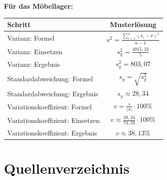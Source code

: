 \documentclass[
  11pt,
  ngerman,
  a4paper,
]{report}
\begin{document}
\textbf{Für das Möbellager:}

\begin{table}[H]
\centering
\begin{tabular}{lc}
\toprule
Schritt & Musterlösung\\
\midrule
Varianz: Formel & $s^2=\frac{\sum\limits_{i=1}^{n}(x_{i}-\bar{x})^2}{n-1}$\\
Varianz: Einsetzen & $s^2_y=\frac{4015{,}33}{5}$\\
Varianz: Ergebnis & $s^2_y=803{,}07$\\
Standardabweichung: Formel & $s_y=\sqrt{s^2_y}$\\
Standardabweichung: Ergebnis & $s_y\approx28{,}34$\\
Variationskoeffizient: Formel & $v=\frac{s}{|\bar{x}|}\cdot100\%$\\
Variationskoeffizient: Einsetzen & $v\approx\frac{28{,}34}{74{,}33}\cdot100\%$\\
Variationskoeffizient: Ergebnis & $v \approx 38{,}13\%$\\
\bottomrule
\end{tabular}
\end{table}

\hypertarget{quellenverzeichnis}{%
\chapter*{Quellenverzeichnis}\label{quellenverzeichnis}}
\end{document}
